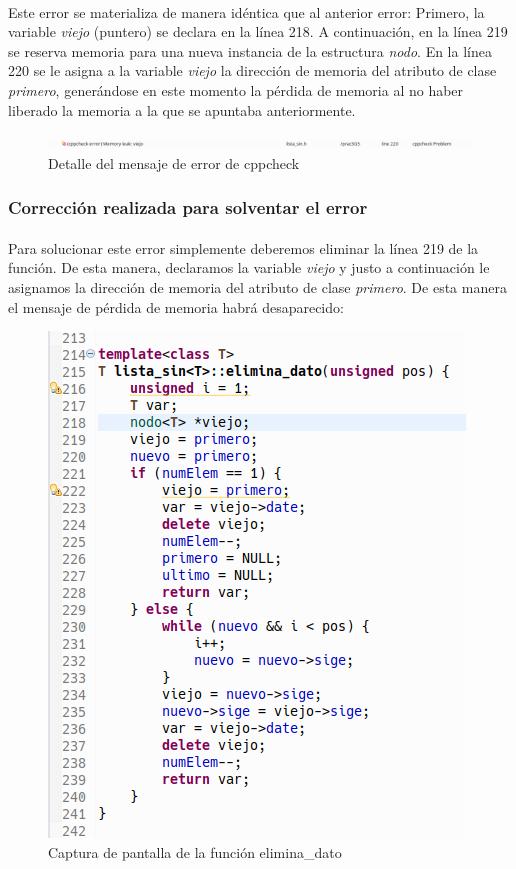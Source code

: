 			\paragraph{}Este error se materializa de manera idéntica que al anterior error: Primero, la variable \textit{viejo} (puntero) se declara en la línea 218. A continuación, en la línea 219 se reserva memoria para una nueva instancia de la estructura \textit{nodo}. En la línea 220 se le asigna a la variable \textit{viejo} la dirección de memoria del atributo de clase \textit{primero}, generándose en este momento la pérdida de memoria al no haber liberado la memoria a la que se apuntaba anteriormente.
			
			\begin{figure}[H]
				\centering
				\includegraphics[scale=0.38]{img/captura46.png}
				\caption{Detalle del mensaje de error de cppcheck}
				\label{captura46}
			\end{figure}
	
		\subsubsection{Corrección realizada para solventar el error}
		
			\paragraph{}Para solucionar este error simplemente deberemos eliminar la línea 219 de la función. De esta manera, declaramos la variable \textit{viejo} y justo a continuación le asignamos la dirección de memoria del atributo de clase \textit{primero}. De esta manera el mensaje de pérdida de memoria habrá desaparecido:
	
			\begin{figure}[H]
				\centering
				\includegraphics[scale=0.7]{img/captura47.png}
				\caption{Captura de pantalla de la función elimina\_dato}
				\label{captura47}
			\end{figure}

\newpage